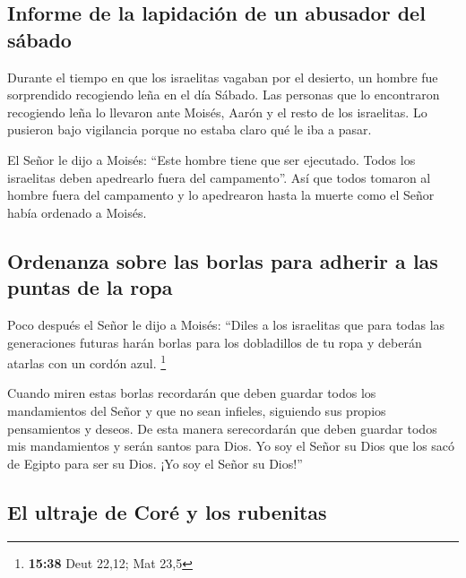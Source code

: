 \hypertarget{informe-de-la-lapidaciuxf3n-de-un-abusador-del-suxe1bado}{%
\subsection{Informe de la lapidación de un abusador del
sábado}\label{informe-de-la-lapidaciuxf3n-de-un-abusador-del-suxe1bado}}

 Durante el tiempo en que los israelitas vagaban por el
desierto, un hombre fue sorprendido recogiendo leña en el día Sábado.
 Las personas que lo encontraron recogiendo leña lo
llevaron ante Moisés, Aarón y el resto de los israelitas.
 Lo pusieron bajo vigilancia porque no estaba claro qué
le iba a pasar.

 El Señor le dijo a Moisés: ``Este hombre tiene que ser
ejecutado. Todos los israelitas deben apedrearlo fuera del campamento''.
 Así que todos tomaron al hombre fuera del campamento y
lo apedrearon hasta la muerte como el Señor había ordenado a Moisés.

\hypertarget{ordenanza-sobre-las-borlas-para-adherir-a-las-puntas-de-la-ropa}{%
\subsection{Ordenanza sobre las borlas para adherir a las puntas de la
ropa}\label{ordenanza-sobre-las-borlas-para-adherir-a-las-puntas-de-la-ropa}}

 Poco después el Señor le dijo a Moisés: 
``Diles a los israelitas que para todas las generaciones futuras harán
borlas para los dobladillos de tu ropa y deberán atarlas con un cordón
azul. \footnote{\textbf{15:38} Deut 22,12; Mat 23,5}

 Cuando miren estas borlas recordarán que deben guardar
todos los mandamientos del Señor y que no sean infieles, siguiendo sus
propios pensamientos y deseos.  De esta manera
serecordarán que deben guardar todos mis mandamientos y serán santos
para Dios. Yo soy el Señor su Dios que los sacó de Egipto para ser su
Dios.  ¡Yo soy el Señor su Dios!''

\hypertarget{el-ultraje-de-coruxe9-y-los-rubenitas}{%
\subsection{El ultraje de Coré y los
rubenitas}\label{el-ultraje-de-coruxe9-y-los-rubenitas}}

